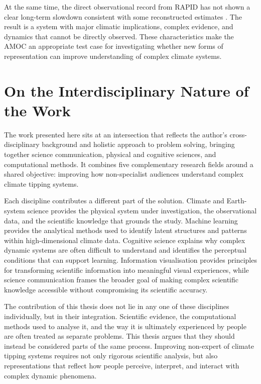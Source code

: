 At the same time, the direct observational record from RAPID has not shown a clear long-term slowdown consistent with some reconstructed estimates \citep{moat2026, rahmstorf2015}. The result is a system with major climatic implications, complex evidence, and dynamics that cannot be directly observed. These characteristics make the AMOC an appropriate test case for investigating whether new forms of representation can improve understanding of complex climate systems.

\section{On the Interdisciplinary Nature of the Work}
\label{sec:positioning}

The work presented here sits at an intersection that reflects the author's cross-disciplinary background and holistic approach to problem solving, bringing together science communication, physical and cognitive sciences, and computational methods. It combines five complementary research fields around a shared objective: improving how non-specialist audiences understand complex climate tipping systems.

Each discipline contributes a different part of the solution. Climate and Earth-system science provides the physical system under investigation, the observational data, and the scientific knowledge that grounds the study. Machine learning provides the analytical methods used to identify latent structures and patterns within high-dimensional climate data. Cognitive science explains why complex dynamic systems are often difficult to understand and identifies the perceptual conditions that can support learning. Information visualisation provides principles for transforming scientific information into meaningful visual experiences, while science communication frames the broader goal of making complex scientific knowledge accessible without compromising its scientific accuracy.

The contribution of this thesis does not lie in any one of these disciplines individually, but in their integration. Scientific evidence, the computational methods used to analyse it, and the way it is ultimately experienced by people are often treated as separate problems. This thesis argues that they should instead be considered parts of the same process. Improving non-expert of climate tipping systems requires not only rigorous scientific analysis, but also representations that reflect how people perceive, interpret, and interact with complex dynamic phenomena.

